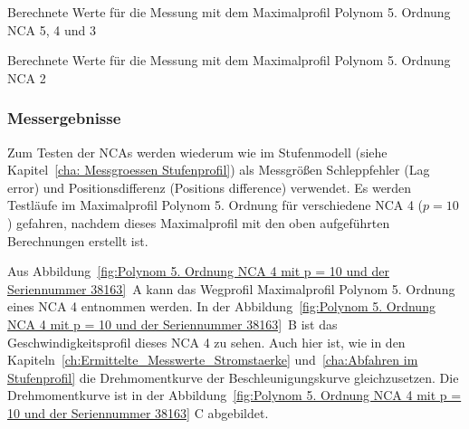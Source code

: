 \begin{sidewaystable}[h]
\centering

\caption{Berechnete Werte für die Messung mit dem Maximalprofil Polynom 5. Ordnung NCA 5, 4 und 3}
\label{Berechnete_Werte_Maximalprofil Polynom 5. Ordnung NCA5, 4 und 3}
\end{sidewaystable}

\begin{sidewaystable}[h]
\centering

\caption{Berechnete Werte für die Messung mit dem Maximalprofil Polynom 5. Ordnung NCA 2}
\label{Berechnete_Werte_Maximalprofil Polynom 5. Ordnung NCA2}
\end{sidewaystable}






\subsubsection{Messergebnisse}


Zum Testen der NCAs  werden wiederum wie im Stufenmodell (siehe Kapitel~\ref{cha: Messgroessen Stufenprofil})  als Messgrößen Schleppfehler (Lag error) und Positionsdifferenz (Positions difference)  verwendet. Es werden Testläufe im Maximalprofil Polynom 5. Ordnung für verschiedene NCA 4 ($p = 10$) gefahren, nachdem dieses Maximalprofil mit den oben aufgeführten Berechnungen erstellt ist.

Aus Abbildung~\ref{fig:Polynom 5. Ordnung NCA 4 mit p = 10 und der Seriennummer 38163}~A  kann das Wegprofil Maximalprofil Polynom 5. Ordnung eines NCA 4 entnommen werden. In der Abbildung~\ref{fig:Polynom 5. Ordnung NCA 4 mit p = 10 und der Seriennummer 38163}~B ist das Geschwindigkeitsprofil dieses NCA 4 zu sehen. Auch hier ist, wie in den Kapiteln~\ref{ch:Ermittelte_Messwerte_Stromstaerke} und~\ref{cha:Abfahren im Stufenprofil} die Drehmomentkurve der Beschleunigungskurve gleichzusetzen. Die Drehmomentkurve ist in der Abbildung~\ref{fig:Polynom 5. Ordnung NCA 4 mit p = 10 und der Seriennummer 38163} C abgebildet.



